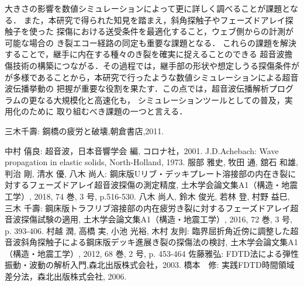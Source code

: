 ﻿\documentclass[11pt,a4j]{mybook2}
\begin{document}
大きさの影響を数値シミュレーションによって更に詳しく調べることが課題となる．
また，本研究で得られた知見を踏まえ，斜角探触子やフェーズドアレイ探触子を使った
探傷における送受条件を最適化すること，ウェブ側からの計測が可能な場合の
き裂エコー経路の同定も重要な課題となる．
これらの課題を解決することで，継手に内在する種々のき裂を確実に捉えることのできる
超音波擔傷技術の構築につながる．その過程では，継手部の形状や想定しうる探傷条件が
が多様であることから，本研究で行ったような数値シミュレーションによる超音波伝播挙動の
把握が重要な役割を果たす．この点では，超音波伝播解析プログラムの更なる大規模化と高速化も，
シミュレーションツールとしての普及，実用化のために
取り組むべき課題の一つと言える．
\renewcommand{\bibname}{参考文献}
\begin{thebibliography}{99}
	三木千壽: 鋼橋の疲労と破壊,朝倉書店,2011.

	中村 僖良: 超音波，日本音響学会 編, コロナ社，2001. 
	J.D.Achebach: Wave propagation in elastic solids, North-Holland, 1973.
	服部 雅史, 牧田 通, 舘石 和雄, 判治 剛, 清水 優, 八木 尚人:
	鋼床版Uリブ・デッキプレート溶接部の内在き裂に対するフェーズドアレイ超音波探傷の測定精度, 
	土木学会論文集A1（構造・地震工学）, 2018, 74 巻, 3 号, p.516-530.
	八木 尚人, 鈴木 俊光, 若林 登, 村野 益巳, 三木 千壽: 
	鋼床版トラフリブ溶接部の内在疲労き裂に対するフェーズドアレイ超音波探傷試験の適用,
	土木学会論文集A1（構造・地震工学）, 2016, 72 巻, 3 号, p. 393-406.
	村越 潤, 高橋 実, 小池 光裕, 木村 友則: 臨界屈折角近傍に調整した超音波斜角探触子による鋼床版デッキ進展き裂の探傷法の検討, 
	土木学会論文集A1（構造・地震工学）, 2012, 68 巻, 2 号, p. 453-464
	佐藤雅弘: FDTD法による弾性振動・波動の解析入門,森北出版株式会社，2003.
	橋本　修: 実践FDTD時間領域差分法，森北出版株式会社, 2006.
\end{thebibliography}
\end{document}
